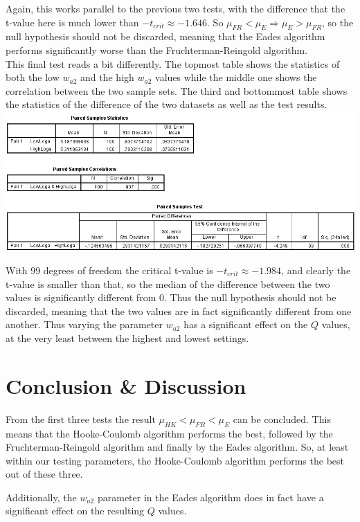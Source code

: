 \documentclass[a4paper,12pt]{article}
\begin{document}
  Again, this works parallel to the previous two tests, with the difference that the t-value here is much lower than $-t_{crit} \approx -1.646$. So $\mu_{FR} < \mu_{E} \Rightarrow \mu_{E} > \mu_{FR}$, so the null hypothesis should not be discarded, meaning that the Eades algorithm performs significantly worse than the Fruchterman-Reingold algorithm. \\
  
  This final test reads a bit differently. The topmost table shows the statistics of both the low $w_{a2}$ and the high $w_{a2}$ values while the middle one shows the correlation between the two sample sets. The third and bottommost table shows the statistics of the difference of the two datasets as well as the test results.
  \includegraphics[width=450pt]{LogPairedTest}
  
  With 99 degrees of freedom the critical t-value is $-t_{crit} \approx -1.984$, and clearly the t-value is smaller than that, so the median of the difference between the two values is significantly different from 0. Thus the null hypothesis should not be discarded, meaning that the two values are in fact significantly different from one another. Thus varying the parameter $w_{a2}$ has a significant effect on the $Q$ values, at the very least between the highest and lowest settings. 

  \section{Conclusion \& Discussion}
  From the first three tests the result $\mu_{HK} < \mu_{FR} < \mu_{E}$ can be concluded. This means that the Hooke-Coulomb algorithm performs the best, followed by the Fruchterman-Reingold algorithm and finally by the Eades algorithm. So, at least within our testing parameters, the Hooke-Coulomb algorithm performs the best out of these three.
  
  Additionally, the $w_{a2}$ parameter in the Eades algorithm does in fact have a significant effect on the resulting $Q$ values.
  
\end{document}
